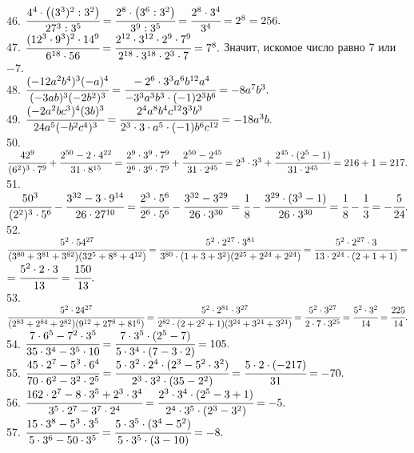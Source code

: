 \documentclass[12pt]{article}
\begin{document}
46. $\cfrac{4^4\cdot\left((3^3)^2: 3^2\right)}{27^3:3^5}=\cfrac{2^8\cdot\left(3^6:3^2\right)}{3^9:3^5}=
\cfrac{2^8\cdot3^4}{3^4}=2^8=256.$\\
47. $\cfrac{(12^3\cdot9^3)^2\cdot14^9}{6^{18}\cdot56}=\cfrac{2^{12}\cdot3^{12}\cdot2^9\cdot7^9}{2^{18}\cdot3^{18}\cdot2^3\cdot7}=7^8.$ Значит, искомое число равно 7 или $-7.$\\
48. $\cfrac{(-12a^2b^4)^3(-a)^4}{(-3ab)^3(-2b^2)^3}=\cfrac{-2^6\cdot 3^3 a^6 b^{12}a^4}{-3^3 a^3 b^3\cdot(-1)2^3 b^6}=-8a^7b^3.$\\
49. $\cfrac{(-2a^2bc^3)^4(3b)^3}{24a^5(-b^2c^4)^3}=\cfrac{2^4 a^8 b^4 c^{12}3^3 b^3}{2^3\cdot 3 \cdot a^5\cdot(-1)b^6c^{12}}=-18a^3b.$\\
50. $\cfrac{42^9}{(6^2)^3\cdot7^9}+\cfrac{2^{50}-2\cdot4^{22}}{31\cdot8^{15}}=\cfrac{2^9\cdot3^9\cdot7^9}{2^6\cdot3^6\cdot7^9}+\cfrac{2^{50}-2^{45}}{31\cdot2^{45}}=
2^3\cdot3^3+\cfrac{2^{45}\cdot(2^5-1)}{31\cdot2^{45}}=216+1=217.$\\
51. $\cfrac{50^3}{(2^2)^3\cdot5^6}-\cfrac{3^{32}-3\cdot9^{14}}{26\cdot27^{10}}=\cfrac{2^3\cdot5^6}{2^6\cdot5^6}-\cfrac{3^{32}-3^{29}}{26\cdot3^{30}}=
\cfrac{1}{8}-\cfrac{3^{29}\cdot(3^3-1)}{26\cdot3^{30}}=\cfrac{1}{8}-\cfrac{1}{3}=-\cfrac{5}{24}.$\\
52. $\cfrac{5^2\cdot54^{27}}{(3^{80}+3^{81}+3^{82})(32^5+8^8+4^{12})}=\cfrac{5^2\cdot2^{27}\cdot3^{81}}{3^{80}\cdot(1+3+3^2)(2^{25}+2^{24}+2^{24})}=
\cfrac{5^2\cdot2^{27}\cdot3}{13\cdot2^{24}\cdot(2+1+1)}=$\\$=\cfrac{5^2\cdot2\cdot3}{13}=\cfrac{150}{13}.$\\
53. $\cfrac{5^2\cdot24^{27}}{(2^{83}+2^{84}+2^{82})(9^{12}+27^8+81^{6})}=\cfrac{5^2\cdot2^{81}\cdot3^{27}}{2^{82}\cdot(2+2^2+1)(3^{24}+3^{24}+3^{24})}=
\cfrac{5^2\cdot3^{27}}{2\cdot7\cdot3^{25}}=\cfrac{5^2\cdot3^2}{14}=\cfrac{225}{14}.$\\
54. $\cfrac{7\cdot6^5-7^2\cdot3^5}{35\cdot3^4-3^5\cdot10}=
\cfrac{7\cdot3^5\cdot(2^5-7)}{5\cdot3^4\cdot(7-3\cdot2)}=105.$\\
55. $\cfrac{45\cdot2^7-5^3\cdot6^4}{70\cdot6^2-3^2\cdot2^5}=
\cfrac{5\cdot3^2\cdot2^4\cdot(2^3-5^2\cdot3^2)}{2^3\cdot3^2\cdot(35-2^2)}=
\cfrac{5\cdot2\cdot(-217)}{31}=-70.$\\
56. $\cfrac{162\cdot2^7-8\cdot3^5+2^3\cdot3^4}{3^5\cdot2^7-3^7\cdot2^4}=
\cfrac{2^3\cdot3^4\cdot(2^5-3+1)}{2^4\cdot3^5\cdot(2^3-3^2)}=-5.$\\
57. $\cfrac{15\cdot3^8-5^3\cdot3^5}{5\cdot3^6-50\cdot3^5}=
\cfrac{5\cdot3^5\cdot(3^4-5^2)}{5\cdot3^5\cdot(3-10)}=-8.$\\
\end{document}
